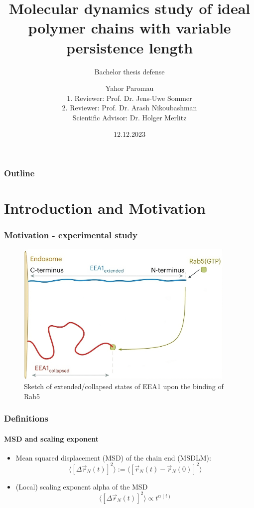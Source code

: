 \documentclass[handout]{beamer}
\title{Molecular dynamics study of ideal polymer chains with variable persistence length}
\subtitle{Bachelor thesis defense}
\author{
    Yahor Paromau
    \vspace{0.5cm}
    \\ 1. Reviewer: Prof. Dr. Jens-Uwe Sommer
    \\ 2. Reviewer: Prof. Dr. Arash Nikoubashman
    \\ Scientific Advisor: Dr. Holger Merlitz
}
\institute{ITP@IPF}
\date{12.12.2023}
\newcommand{\E}[1]{\langle#1\rangle}
\begin{document}
\begin{frame}
    \titlepage
\end{frame}


\begin{frame}
    \frametitle{Outline}
    \tableofcontents
\end{frame}

\section{Introduction and Motivation}


\begin{frame}
    \frametitle{Motivation - experimental study}
    \begin{figure}[h]
        \includegraphics[height=6.9cm]{./Singh_intro_a.png}
        \caption{
            Sketch of extended/collapsed states of EEA1 upon the binding of Rab5
            \cite{Singh:2022}
        }
    \end{figure}
\end{frame}


\begin{frame}
    \frametitle{Definitions}
    \framesubtitle{MSD and scaling exponent}
    \begin{itemize}
        \item Mean squared displacement (MSD) of the chain end (MSDLM):
        $$\E{[\Delta\vec{r}_N(t)]^2} := \E{[\vec{r}_N(t)-\vec{r}_N(0)]^2}$$
        \item (Local) scaling exponent alpha of the MSD \cite{Singh:2022}
        $$\E{[\Delta\vec{r}_N(t)]^2} \propto t^{\alpha(t)}$$
    \end{itemize}
\end{frame}
\end{document}
